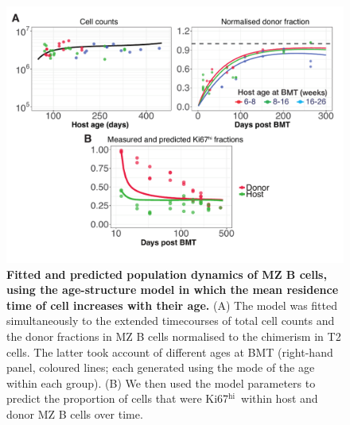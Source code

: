 \documentclass[11pt]{article}
\newcommand{\khi}{Ki67$^\text{hi}$}
\begin{document}
\begin{figure}[h!]
	\centerline{\includegraphics[scale = 0.85] {ASM_MZ.pdf}}
	\caption{\small \textbf{Fitted and predicted   population dynamics of MZ B cells, using the age-structure model in which the mean residence time of cell increases with their age.}  (A) The model was fitted simultaneously to the extended timecourses of total cell counts and the donor fractions in MZ B cells normalised to the chimerism in T2 cells. The latter took account of different ages at BMT (right-hand panel, coloured lines; each generated using the  mode of the age within each group). (B) We then used the model parameters to predict the proportion of cells that were \khi\ within host and donor MZ B cells over time.}
	\label{fig:ASM_MZ}
\end{figure}
\end{document}
